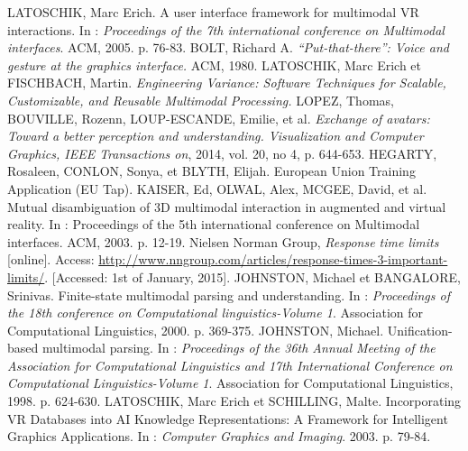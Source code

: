 \documentclass[a4paper]{article}
\begin{document}
\begin{thebibliography}{1}
	 LATOSCHIK, Marc Erich. A user interface framework for multimodal VR interactions. In : \textit{Proceedings of the 7th international conference on Multimodal interfaces}. ACM, 2005. p. 76-83.
	 BOLT, Richard A. \textit{“Put-that-there”: Voice and gesture at the graphics interface.} ACM, 1980.
	 LATOSCHIK, Marc Erich et FISCHBACH, Martin. \textit{Engineering Variance: Software Techniques for Scalable, Customizable, and Reusable Multimodal Processing.}
	 LOPEZ, Thomas, BOUVILLE, Rozenn, LOUP-ESCANDE, Emilie, et al. \textit{Exchange of avatars: Toward a better perception and understanding. Visualization and Computer Graphics, IEEE Transactions on}, 2014, vol. 20, no 4, p. 644-653.
	 HEGARTY, Rosaleen, CONLON, Sonya, et BLYTH, Elijah. European Union Training Application (EU Tap).
	 KAISER, Ed, OLWAL, Alex, MCGEE, David, et al. Mutual disambiguation of 3D multimodal interaction in augmented and virtual reality. In : Proceedings of the 5th international conference on Multimodal interfaces. ACM, 2003. p. 12-19.
	 Nielsen Norman Group, \textit{Response time limits} [online]. Access: \url{http://www.nngroup.com/articles/response-times-3-important-limits/}. [Accessed: 1st of January, 2015].
	 JOHNSTON, Michael et BANGALORE, Srinivas. Finite-state multimodal parsing and understanding. In : \textit{Proceedings of the 18th conference on Computational linguistics-Volume 1}. Association for Computational Linguistics, 2000. p. 369-375.
	 JOHNSTON, Michael. Unification-based multimodal parsing. In : \textit{Proceedings of the 36th Annual Meeting of the Association for Computational Linguistics and 17th International Conference on Computational Linguistics-Volume 1}. Association for Computational Linguistics, 1998. p. 624-630.
	 LATOSCHIK, Marc Erich et SCHILLING, Malte. Incorporating VR Databases into AI Knowledge Representations: A Framework for Intelligent Graphics Applications. In : \textit{Computer Graphics and Imaging}. 2003. p. 79-84.
\end{thebibliography}
\end{document}
